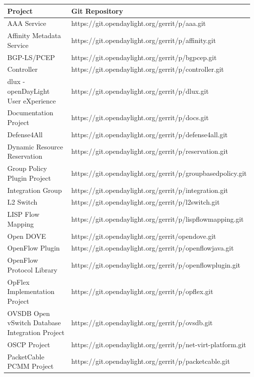 \documentclass[a4paper, 12pt]{book}
\begin{document}
\begin{table}[H]
\footnotesize
\begin{center}
\begin{tabular}{|p{6cm}|l|}
\hline
\textbf{Project} & \textbf{Git Repository} \\ \hline
AAA Service & https://git.opendaylight.org/gerrit/p/aaa.git \\ \hline
Affinity Metadata Service & https://git.opendaylight.org/gerrit/p/affinity.git \\ \hline
BGP-LS/PCEP & https://git.opendaylight.org/gerrit/p/bgpcep.git \\ \hline
Controller & https://git.opendaylight.org/gerrit/p/controller.git \\ \hline
dlux - openDayLight User eXperience & https://git.opendaylight.org/gerrit/p/dlux.git \\ \hline
Documentation Project & https://git.opendaylight.org/gerrit/p/docs.git \\ \hline
Defense4All & https://git.opendaylight.org/gerrit/p/defense4all.git \\ \hline
Dynamic Resource Reservation  & https://git.opendaylight.org/gerrit/p/reservation.git \\ \hline
Group Policy Plugin Project & https://git.opendaylight.org/gerrit/p/groupbasedpolicy.git \\ \hline
Integration Group & https://git.opendaylight.org/gerrit/p/integration.git \\ \hline
L2 Switch & https://git.opendaylight.org/gerrit/p/l2switch.git \\ \hline
LISP Flow Mapping & https://git.opendaylight.org/gerrit/p/lispflowmapping.git \\ \hline
Open DOVE & https://git.opendaylight.org/gerrit/opendove.git \\ \hline
OpenFlow Plugin & https://git.opendaylight.org/gerrit/p/openflowjava.git \\ \hline
OpenFlow Protocol Library & https://git.opendaylight.org/gerrit/p/openflowplugin.git \\ \hline
OpFlex Implementation Project & https://git.opendaylight.org/gerrit/p/opflex.git \\ \hline
OVSDB Open vSwitch Database Integration Project & https://git.opendaylight.org/gerrit/p/ovsdb.git \\ \hline
OSCP Project & https://git.opendaylight.org/gerrit/p/net-virt-platform.git \\ \hline
PacketCable PCMM Project & https://git.opendaylight.org/gerrit/p/packetcable.git \\ \hline

\end{tabular}
\end{center}
\end{table}
\end{document}
